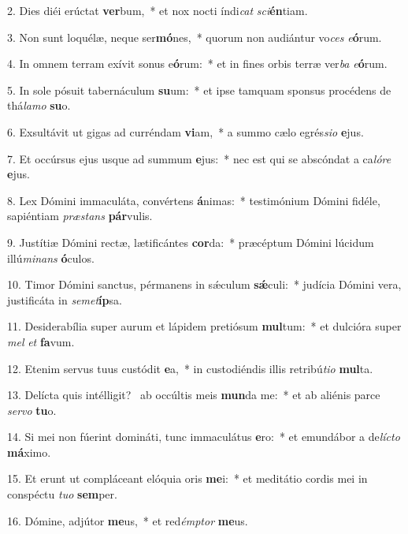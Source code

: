 2. Dies diéi erúctat \textbf{ver}bum,~*  et nox nocti índi\textit{cat} \textit{sci}\textbf{én}tiam.\

3. Non sunt loquélæ, neque ser\textbf{mó}nes,~*  quorum non audiántur vo\textit{ces} \textit{e}\textbf{ó}rum.\

4. In omnem terram exívit sonus e\textbf{ó}rum:~*  et in fines orbis terræ ver\textit{ba} \textit{e}\textbf{ó}rum.\

5. In sole pósuit tabernáculum \textbf{su}um:~*  et ipse tamquam sponsus procédens de thá\textit{la}\textit{mo} \textbf{su}o.\

6. Exsultávit ut gigas ad curréndam \textbf{vi}am,~*  a summo cælo egrés\textit{si}\textit{o} \textbf{e}jus.\

7. Et occúrsus ejus usque ad summum \textbf{e}jus:~*  nec est qui se abscóndat a ca\textit{ló}\textit{re} \textbf{e}jus.\

8. Lex Dómini immaculáta, convértens \textbf{á}nimas:~*  testimónium Dómini fidéle, sapiéntiam \textit{præ}\textit{stans} \textbf{pár}vulis.\

9. Justítiæ Dómini rectæ, lætificántes \textbf{cor}da:~*  præcéptum Dómini lúcidum illú\textit{mi}\textit{nans} \textbf{ó}culos.\

10. Timor Dómini sanctus, pérmanens in sǽculum \textbf{sǽ}culi:~*  judícia Dómini vera, justificáta in \textit{se}\textit{met}\textbf{íp}sa.\

11. Desiderabília super aurum et lápidem pretiósum \textbf{mul}tum:~*  et dulcióra super \textit{mel} \textit{et} \textbf{fa}vum.\

12. Etenim servus tuus custódit \textbf{e}a,~*  in custodiéndis illis retribú\textit{ti}\textit{o} \textbf{mul}ta.\

13. Delícta quis intélligit? \dag\  ab occúltis meis \textbf{mun}da me:~*  et ab aliénis parce \textit{ser}\textit{vo} \textbf{tu}o.\

14. Si mei non fúerint domináti, tunc immaculátus \textbf{e}ro:~*  et emundábor a de\textit{líc}\textit{to} \textbf{má}ximo.\

15. Et erunt ut compláceant elóquia oris \textbf{me}i:~*  et meditátio cordis mei in conspéctu \textit{tu}\textit{o} \textbf{sem}per.\

16. Dómine, adjútor \textbf{me}us,~*  et red\textit{émp}\textit{tor} \textbf{me}us.\


